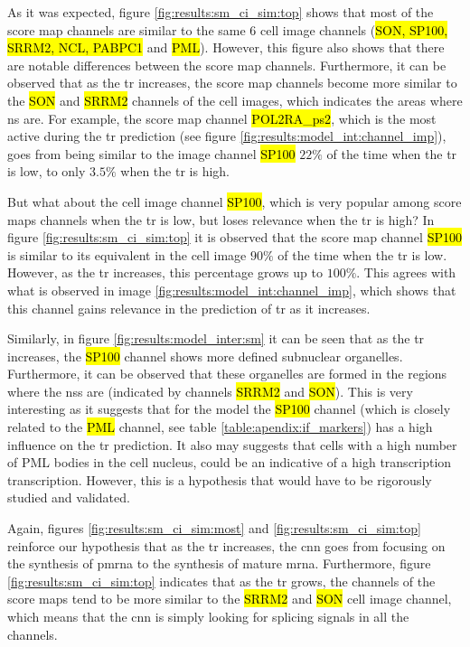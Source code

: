 As it was expected, figure \ref{fig:results:sm_ci_sim:top} shows that most of the score map channels are similar to the same 6 cell image channels (\hl{SON, SP100, SRRM2, NCL, PABPC1} and \hl{PML}).
However, this figure also shows that there are notable differences between the score map channels. Furthermore, it can be observed that as the \gls{tr} increases, the score map channels become more similar to the \hl{SON} and \hl{SRRM2} channels of the cell images, which indicates the areas where \gls{ns} are.
For example, the score map channel \hl{POL2RA\_ps2}, which is the most active during the \gls{tr} prediction (see figure \ref{fig:results:model_int:channel_imp}), goes from being similar to the image channel \hl{SP100} $22\%$ of the time when the \gls{tr} is low, to only $3.5\%$ when the \gls{tr} is high.

But what about the cell image channel \hl{SP100}, which is very popular among score maps channels when the \gls{tr} is low, but loses relevance when the \gls{tr} is high?
In figure \ref{fig:results:sm_ci_sim:top} it is observed that the score map channel \hl{SP100} is similar to its equivalent in the cell image $90\%$ of the time when the \gls{tr} is low. However, as the \gls{tr} increases, this percentage grows up to $100\%$.
This agrees with what is observed in image \ref{fig:results:model_int:channel_imp}, which shows that this channel gains relevance in the prediction of \gls{tr} as it increases.

Similarly, in figure \ref{fig:results:model_inter:sm} it can be seen that as the \gls{tr} increases, the \hl{SP100} channel shows more defined subnuclear organelles. Furthermore, it can be observed that these organelles are formed in the regions where the \glspl{ns} are (indicated by channels \hl{SRRM2} and \hl{SON}). This is very interesting as it suggests that for the model the \hl{SP100} channel (which is closely related to the \hl{PML} channel, see table \ref{table:apendix:if_markers}) has a high influence on the \gls{tr} prediction. It also may suggests that cells with a high number of PML bodies in the cell nucleus, could be an indicative of a high transcription transcription. However, this is a hypothesis that would have to be rigorously studied and validated.

Again, figures \ref{fig:results:sm_ci_sim:most} and \ref{fig:results:sm_ci_sim:top} reinforce our hypothesis that as the \gls{tr} increases, the \gls{cnn} goes from focusing on the synthesis of \gls{pmrna} to the synthesis of mature \gls{mrna}.
Furthermore, figure \ref{fig:results:sm_ci_sim:top} indicates that as the \gls{tr} grows, the channels of the score maps tend to be more similar to the \hl{SRRM2} and \hl{SON} cell image channel, which means that the \gls{cnn} is simply looking for splicing signals in all the channels.
